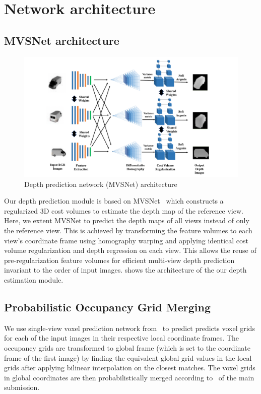 \section*{Network architecture}
\subsection*{MVSNet architecture}
\label{subsec:mvsnet}

\begin{figure}[ht]
    \begin{center}
        \includegraphics[width=\linewidth]{imgs/MVSNet_architecture.pdf}
    \end{center}
    \vspace{-4mm}
        \caption{Depth prediction network (MVSNet) architecture}
        \vspace{-4mm}
        \label{fig:mvsnet_architecture}
\end{figure}

Our depth prediction module is based on MVSNet~\cite{yao2018mvsnet} which constructs a regularized 3D cost volumes
to estimate the depth map of the reference view.
Here, we extent MVSNet to predict the depth maps of all views instead of only the reference view.
This is achieved by transforming the feature volumes to each view's coordinate frame using homography warping
and applying identical cost volume regularization and depth regression on each view.
This allows the reuse of pre-regularization feature volumes for efficient multi-view depth prediction invariant to the order of input images.
 shows the architecture of the our depth estimation module.

\subsection*{Probabilistic Occupancy Grid Merging}
We use single-view voxel prediction network from~\cite{gkioxari2019meshrcnn} to predict predicts voxel grids for each of the input images in their respective local coordinate frames.
The occupancy grids are transformed to global frame (which is set to the coordinate frame of the first image)
by finding the equivalent global grid values in the local grids after applying bilinear interpolation on the closest matches.
The voxel grids in global coordinates are then probabilistically merged according to~ of the main submission.

